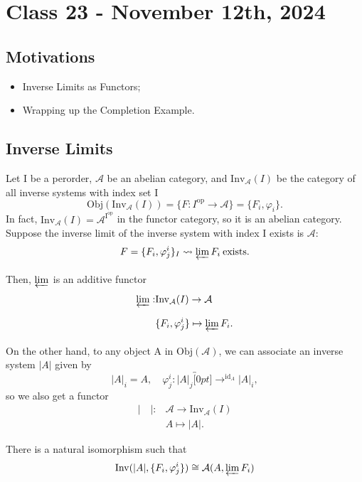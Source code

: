 \documentclass[../category_theory.tex]{subfiles}
\begin{document}
\section{Class 23 - November 12th, 2024}
\subsection{Motivations}
\begin{itemize}
	\item Inverse Limits as Functors;
	\item Wrapping up the Completion Example.
\end{itemize}
\subsection{Inverse Limits}
Let I be a perorder, \(\mathcal{A}\) be an abelian category, and \(\mathrm{Inv}_{\mathcal{A}}(I)\) be the category of all inverse systems with index set I
\[
	\mathrm{Obj}(\mathrm{Inv}_{\mathcal{A}}(I))=\{F:I^{\mathrm{op}}\rightarrow \mathcal{A}\}=\{F_{i},  \varphi_{i}\}.
\]
In fact, \(\mathrm{Inv}_{\mathcal{A}}(I)=\mathcal{A}^{\mathrm{I}^{\mathrm{op}}}\) in the functor category, so it is an abelian category. Suppose the inverse limit of the inverse system with index I exists is \(\mathcal{A}\):
\[
	F=\{F_{i}, \varphi_{j}^{i}\}_{I}\rightsquigarrow \varprojlim_{}F_{i} \:\text{exists}.
\]
Then, \(\varprojlim_{}\) is an additive functor
\begin{align*}
	\varprojlim_{}: & \mathrm{Inv}_{\mathcal{A}}(I)\rightarrow \mathcal{A}    \\
	                & \{F_{i}, \varphi_{j}^{i}\} \mapsto \varprojlim_{}F_{i}.
\end{align*}
On the other hand, to any object A in \(\mathrm{Obj}(\mathcal{A})\), we can associate an inverse system \(|A|\) given by
\[
	|A|_{i}=A,\quad \varphi_{j}^{i}:|A|_{j}\overbracket[0pt]{\rightarrow}^{\mathrm{id}_{A}}|A|_{i},
\]
so we also get a functor
\begin{align*}
	|\quad |: & \mathcal{A}\rightarrow \mathrm{Inv}_{\mathcal{A}}(I) \\
	          & A\mapsto |A|.
\end{align*}
\begin{prop*}
	There is a natural isomorphism such that
	\[
		\mathrm{Inv}(|A|, \{F_{i}, \varphi_{j}^{i}\})\cong \mathcal{A}(A, \varprojlim_{}F_{i})
	\]
\end{prop*}
\end{document}
